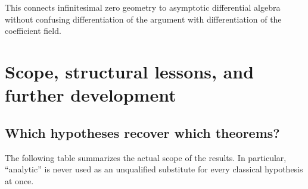 \documentclass[11pt,a4paper]{article}
\numberwithin{equation}{section}
\theoremstyle{definition}
\begin{document}
This connects infinitesimal zero geometry to asymptotic differential algebra
without confusing differentiation of the argument with differentiation of
the coefficient field.

\section{Scope, structural lessons, and further development}
\label{sec:scope}

\subsection{Which hypotheses recover which theorems?}

The following table summarizes the actual scope of the results. In particular,
``analytic'' is never used as an unqualified substitute for every classical
hypothesis at once.
\end{document}
